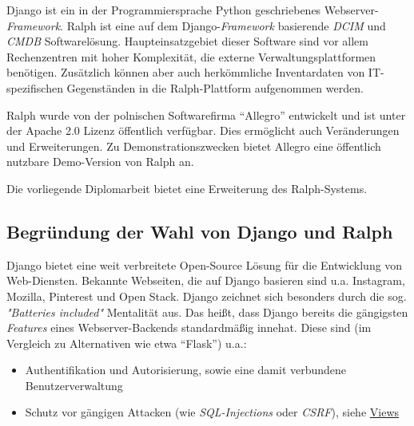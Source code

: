 Django ist ein in der Programmiersprache Python geschriebenes
Webserver-\emph{Framework}.
Ralph ist eine auf dem
Django-\emph{Framework}
basierende
\emph{DCIM}
und
\emph{CMDB}
Softwarelösung. Haupteinsatzgebiet dieser Software sind vor allem
Rechenzentren mit hoher Komplexität, die externe Verwaltungsplattformen
benötigen. Zusätzlich können aber auch herkömmliche Inventardaten von
IT-spezifischen Gegenständen in die Ralph-Plattform aufgenommen werden.

Ralph wurde von der polnischen Softwarefirma ``Allegro'' entwickelt und
ist unter der Apache 2.0 Lizenz öffentlich verfügbar. Dies ermöglicht
auch Veränderungen und Erweiterungen. Zu Demonstrationszwecken bietet
Allegro eine öffentlich nutzbare Demo-Version \cite{ralph-demo} von
Ralph an.

Die vorliegende Diplomarbeit bietet eine Erweiterung des Ralph-Systems.

\hypertarget{begruxfcndung-der-wahl-von-django-und-ralph}{%
\subsection{Begründung der Wahl von Django und
Ralph}\label{begruxfcndung-der-wahl-von-django-und-ralph}}

Django bietet eine weit verbreitete Open-Source Lösung für die
Entwicklung von Web-Diensten. Bekannte Webseiten, die auf Django
basieren sind u.a. Instagram, Mozilla, Pinterest und Open Stack.
\cite{django-overview} Django zeichnet sich besonders durch die sog.
\emph{"Batteries included"}
Mentalität aus. Das heißt, dass Django bereits die gängigsten
\emph{Features}
eines Webserver-Backends standardmäßig innehat. Diese sind (im Vergleich
zu Alternativen wie etwa ``Flask'') u.a.:

\begin{itemize}
\tightlist
\item
  Authentifikation und Autorisierung, sowie eine damit verbundene
  Benutzerverwaltung
\item
  Schutz vor gängigen Attacken (wie
  \emph{SQL-Injections}
  oder
  \emph{CSRF}\cite{csrf}),
  siehe \protect\hyperlink{views}{Views}
\end{itemize}

